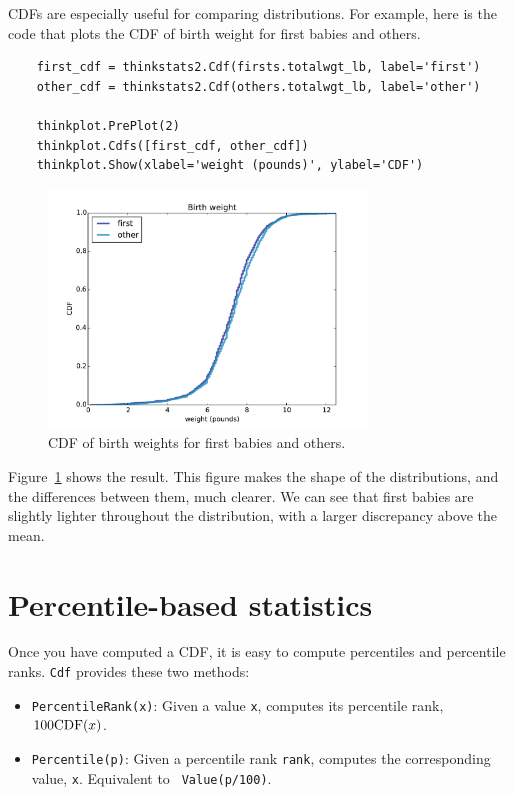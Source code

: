 \documentclass[12pt]{book}
\begin{document}
CDFs are especially useful for comparing distributions.  For
example, here is the code that plots the CDF of birth
weight for first babies and others.

\begin{verbatim}
    first_cdf = thinkstats2.Cdf(firsts.totalwgt_lb, label='first')
    other_cdf = thinkstats2.Cdf(others.totalwgt_lb, label='other')

    thinkplot.PrePlot(2)
    thinkplot.Cdfs([first_cdf, other_cdf])
    thinkplot.Show(xlabel='weight (pounds)', ylabel='CDF')
\end{verbatim}

\begin{figure}
\centerline{\includegraphics[height=2.5in]{figs/cumulative_birthwgt_cdf.pdf}}
\caption{CDF of birth weights for first babies and others.}
\label{cumulative_birthwgt_cdf}
\end{figure}

Figure~\ref{cumulative_birthwgt_cdf} shows the result.
This figure makes the shape of the distributions, and the differences
between them, much clearer.  We can see that first babies are slightly
lighter throughout the distribution, with a larger discrepancy above 
the mean.




\section{Percentile-based statistics}

Once you have computed a CDF, it is easy to compute percentiles
and percentile ranks.  {\tt Cdf} provides these two methods:

\begin{itemize}

\item {\tt PercentileRank(x)}: Given a value {\tt x}, computes its
  percentile rank, $100 \mathrm{CDF}(x)$.

\item {\tt Percentile(p)}: Given a percentile rank {\tt rank},
  computes the corresponding value, {\tt x}.  Equivalent to {\tt
    Value(p/100)}.

\end{itemize}
\end{document}
